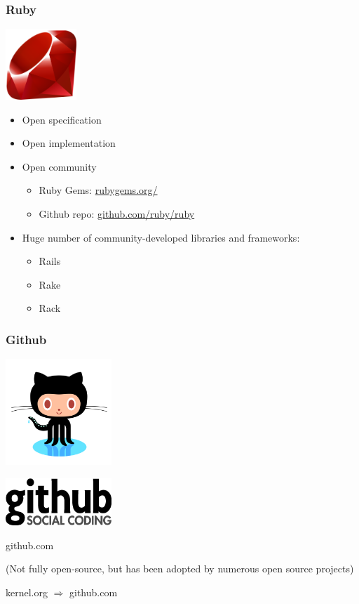\documentclass{beamer}
\begin{document}
\begin{frame}
  \frametitle{Ruby}
  \begin{center} 
    \includegraphics[width=0.2\textwidth]{../img/ruby}

    \begin{itemize}
    \item Open specification
    \item Open implementation
    \item Open community
      \begin{itemize}
      \item Ruby Gems: \href{http://rubygems.org/}{rubygems.org/}
      \item Github repo: \href{https://github.com/ruby/ruby}{github.com/ruby/ruby}
      \end{itemize}
    \item Huge number of community-developed libraries and frameworks:
      \begin{itemize}
      \item Rails
      \item Rake
      \item Rack
      \end{itemize}
    \end{itemize}
  \end{center}
\end{frame}

\begin{frame}
  \frametitle{Github}
  \begin{center}
    \includegraphics[width=0.3\textwidth]{../img/octocat}

    \includegraphics[width=0.3\textwidth]{../img/github-logo}

    github.com

    \vspace{1em}

    \begin{footnotesize}
      (Not fully open-source, but has been adopted by numerous open
      source projects)

      kernel.org $\Rightarrow$ github.com
    \end{footnotesize}
  \end{center}
\end{frame}
\end{document}
